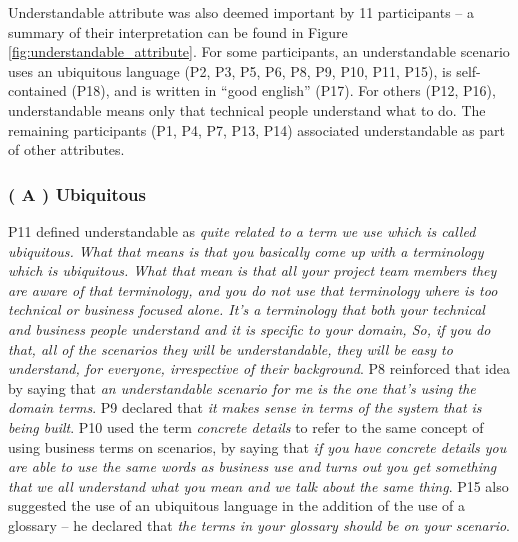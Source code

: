 Understandable attribute was also deemed important by 11 participants -- a summary of their interpretation can be found in Figure \ref{fig:understandable_attribute}. For some participants, an understandable scenario uses an ubiquitous language (P2, P3, P5, P6, P8, P9, P10, P11, P15), is self-contained (P18), and is written in ``good english'' (P17). For others (P12, P16), understandable means only that technical people understand what to do. The remaining participants (P1, P4, P7, P13, P14) associated understandable as part of other attributes.

\subsubsection{\textbf{( A ) Ubiquitous}}
P11 defined understandable as \textit{quite related to a term we use which is called ubiquitous. What that means is that you basically come up with a terminology which is ubiquitous. What that mean is that all your project team members they are aware of that terminology, and you do not use that terminology where is too technical or business focused alone. It's a terminology that both your technical and business people understand and it is specific to your domain, So, if you do that, all of the scenarios they will be understandable, they will be easy to understand, for everyone, irrespective of their background}. P8 reinforced that idea by saying that \textit{an understandable scenario for me is the one that's using the domain terms}. P9 declared that \textit{it makes sense in terms of the system that is being built}. P10 used the term \textit{concrete details} to refer to the same concept of using business terms on scenarios, by saying that \textit{if you have concrete details you are able to use the same words as business use and turns out you get something that we all understand what you mean and we talk about the same thing}. P15 also suggested the use of an ubiquitous language in the addition of the use of a glossary -- he declared that \textit{the terms in your glossary should be on your scenario}.

